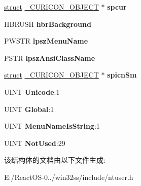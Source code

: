 \begin{DoxyCompactItemize}
\hyperlink{interfacestruct}{struct} \hyperlink{struct___c_u_r_i_c_o_n___o_b_j_e_c_t}{\+\_\+\+C\+U\+R\+I\+C\+O\+N\+\_\+\+O\+B\+J\+E\+CT} $\ast$ {\bfseries spcur}
\item 
\mbox{\label{struct___c_l_s_adc353ab9ae41557d810ff66c90bd94b1}} 
H\+B\+R\+U\+SH {\bfseries hbr\+Background}
\item 
\mbox{\label{struct___c_l_s_a3d76ce5fee4ce16795bf0b390cc1bb6a}} 
P\+W\+S\+TR {\bfseries lpsz\+Menu\+Name}
\item 
\mbox{\label{struct___c_l_s_a97c2f15255fe4e587607e10b43b7c83a}} 
P\+S\+TR {\bfseries lpsz\+Ansi\+Class\+Name}
\item 
\mbox{\label{struct___c_l_s_ac7895051431fd3d9a0170440bab0db5c}} 
\hyperlink{interfacestruct}{struct} \hyperlink{struct___c_u_r_i_c_o_n___o_b_j_e_c_t}{\+\_\+\+C\+U\+R\+I\+C\+O\+N\+\_\+\+O\+B\+J\+E\+CT} $\ast$ {\bfseries spicn\+Sm}
\item 
\mbox{\label{struct___c_l_s_a2d5c60d1d539aec4925d7e8bb72e27a7}} 
U\+I\+NT {\bfseries Unicode}\+:1
\item 
\mbox{\label{struct___c_l_s_a5649a7fb4a4cf56525768fca5463b53c}} 
U\+I\+NT {\bfseries Global}\+:1
\item 
\mbox{\label{struct___c_l_s_a3600b032fea0142122455bf378227d27}} 
U\+I\+NT {\bfseries Menu\+Name\+Is\+String}\+:1
\item 
\mbox{\label{struct___c_l_s_ae5c05bd3fec1a82d7576d49fcc5590c4}} 
U\+I\+NT {\bfseries Not\+Used}\+:29
\end{DoxyCompactItemize}


该结构体的文档由以下文件生成\+:\begin{DoxyCompactItemize}
\item 
E\+:/\+React\+O\+S-\/0../win32ss/include/ntuser.\+h\end{DoxyCompactItemize}
